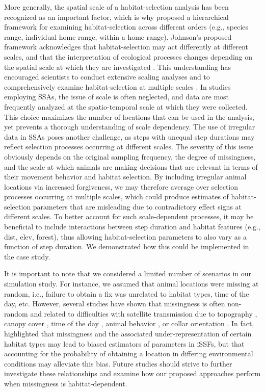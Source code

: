 \documentclass[abstract=on,10pt,a4paper,bibliography=totocnumbered]{article}
\begin{document}
More generally, the spatial scale of a habitat-selection analysis has been
recognized as an important factor, which is why \citet{Johnson.1980} proposed a
hierarchical framework for examining habitat-selection across different orders
(e.g., species range, individual home range, within a home range). Johnson's
proposed framework acknowledges that habitat-selection may act differently at
different scales, and that the interpretation of ecological processes changes
depending on the spatial scale at which they are investigated \citep{Wiens.1989,
Levin.1992}. This understanding has encouraged scientists to conduct extensive
scaling analyses and to comprehensively examine habitat-selection at multiple
scales \citep{DeCesare.2012, McGarigal.2016, Pitman.2017, Zeller.2017}. In
studies employing SSAs, the issue of scale is often neglected, and data are most
frequently analyzed at the spatio-temporal scale at which they were collected.
This choice maximizes the number of locations that can be used in the analysis,
yet prevents a thorough understanding of scale dependency. The use of irregular
data in SSAs poses another challenge, as steps with unequal step durations may
reflect selection processes occurring at different scales. The severity of this
issue obviously depends on the original sampling frequency, the degree of
missingness, and the scale at which animals are making decisions that are
relevant in terms of their movement behavior and habitat selection. By including
irregular animal locations via increased forgiveness, we may therefore average
over selection processes occurring at multiple scales, which could produce
estimates of habitat-selection parameters that are misleading due to
contradictory effect signs at different scales. To better account for such
scale-dependent processes, it may be beneficial to include interactions between
step duration and habitat features (e.g., \textsf{dist}, \textsf{elev},
\textsf{forest}), thus allowing habitat-selection parameters to also vary as a
function of step duration. We demonstrated how this could be implemented in the
case study.

It is important to note that we considered a limited number of scenarios in our
simulation study. For instance, we assumed that animal locations were missing at
random, i.e., failure to obtain a fix was unrelated to habitat types, time of
the day, etc. However, several studies have shown that missingness is often
non-random and related to difficulties with satellite transmission due to
topography \citep{Lewis.2007}, canopy cover \citep{Phillips.1998, DeCesare.2005,
Hansen.2008}, time of the day \citep{Graves.2006}, animal behavior
\citep{Mattisson.2010}, or collar orientation \citep{Deon.2005}. In fact,
\citet{Vales.2022} highlighted that missingness and the associated
under-representation of certain habitat types may lead to biased estimators of
parameters in iSSFs, but that accounting for the probability of obtaining a
location in differing environmental conditions may alleviate this bias. Future
studies should strive to further investigate these relationships and examine how
our proposed approaches perform when missingness is habitat-dependent.
\end{document}
